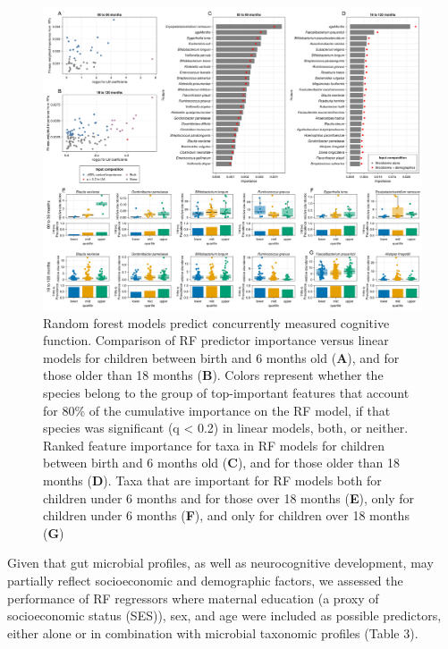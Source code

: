 \documentclass{article}
\begin{document}
\begin{figure}
    \centering
    \includegraphics[width=\textwidth]{assets/Figure3.png}
    \caption{
        Random forest models predict concurrently measured cognitive function.
        Comparison of RF predictor importance versus linear models for children
        between birth and 6 months old (\textbf{A}), and for those older than 18 months
        (\textbf{B}). Colors represent whether the species belong to the group of
        top-important features that account for 80\% of the cumulative
        importance on the RF model, if that species was significant (q
        \textless{} 0.2) in linear models, both, or neither. Ranked feature
        importance for taxa in RF models for children between birth and 6 months
        old (\textbf{C}), and for those older than 18 months (\textbf{D}). Taxa that are important
        for RF models both for children under 6 months and for those over 18
        months (\textbf{E}), only for children under 6 months (\textbf{F}), and only for children
        over 18 months (\textbf{G})
    }
    \label{fig:3}
\end{figure}


Given that gut microbial profiles, as well as neurocognitive
development, may partially reflect socioeconomic and demographic
factors, we assessed the performance of RF regressors where maternal
education (a proxy of socioeconomic status (SES)), sex, and age were
included as possible predictors, either alone or in combination with
microbial taxonomic profiles (Table 3).
\end{document}
